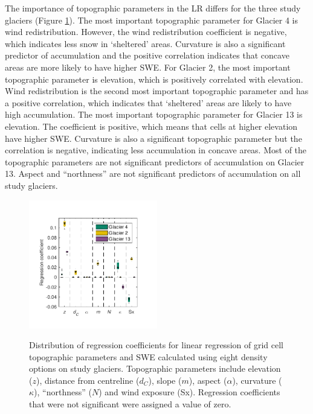 \documentclass[twocolumn,letterpaper]{igs}
\begin{document}
The importance of topographic parameters in the LR differs for the three study glaciers (Figure \ref{fig:BetaCoeffs}). The most important topographic parameter for Glacier 4 is wind redistribution. However, the wind redistribution coefficient is negative, which indicates less snow in `sheltered' areas. Curvature is also a significant predictor of accumulation and the positive correlation indicates that concave areas are more likely to have higher SWE. For Glacier 2, the most important topographic parameter is elevation, which is positively correlated with elevation. Wind redistribution is the second most important topographic parameter and has a positive correlation, which indicates that `sheltered' areas are likely to have high accumulation. The most important topographic parameter for Glacier 13 is elevation. The coefficient is positive, which means that cells at higher elevation have higher SWE. Curvature is also a significant topographic parameter but the correlation is negative, indicating less accumulation in concave areas. Most of the topographic parameters are not significant predictors of accumulation on Glacier 13. Aspect and ``northness'' are not significant predictors of accumulation on all study glaciers.

\begin{figure}
	\centering
	\includegraphics[width =0.5\textwidth]{BetaCoeffs.pdf}\\
	\caption{Distribution of regression coefficients for linear regression of grid cell topographic parameters and SWE calculated using eight density options on study glaciers. Topographic parameters include elevation ($z$), distance from centreline ($d_C$), slope ($m$), aspect ($\alpha$), curvature ($\kappa$), ``northness'' ($N$) and wind exposure (Sx). Regression coefficients that were not significant were assigned a value of zero.}
	\label{fig:BetaCoeffs}
\end{figure}
\end{document}
